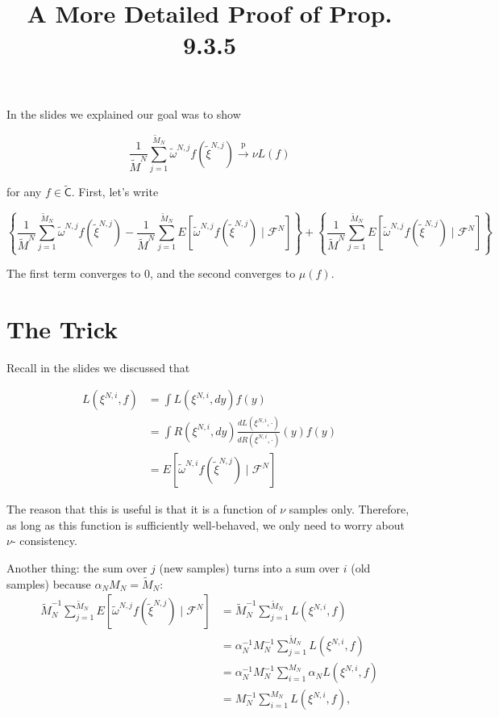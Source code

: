 \documentclass{article}
\title{A More Detailed Proof of Prop. 9.3.5}
\begin{document}
\maketitle

In the slides we explained our goal was to show 

$$
\frac{1}{\tilde{M}^N} \sum_{j=1}^{\tilde{M}_N} \tilde{\omega}^{N,j} f(\tilde{\xi}^{N,j})\overset{\text{p}}{\to} \nu L(f)
$$

for any $f \in \tilde{\mathsf{C}}$. First, let's write

$$  
\left\{
\frac{1}{\tilde{M}^N} \sum_{j=1}^{\tilde{M}_N} \tilde{\omega}^{N,j} f(\tilde{\xi}^{N,j}) 
- \frac{1}{\tilde{M}^N} \sum_{j=1}^{\tilde{M}_N} E\left[ \tilde{\omega}^{N,j} f(\tilde{\xi}^{N,j}) \mid \mathcal{F}^N \right]  \right\}
+ \left\{ \frac{1}{\tilde{M}^N} \sum_{j=1}^{\tilde{M}_N} E\left[ \tilde{\omega}^{N,j} f(\tilde{\xi}^{N,j}) \mid \mathcal{F}^N \right]  \right\}
$$

The first term converges to $0$, and the second converges to $\mu(f)$. 

\section{The Trick}

Recall in the slides we discussed that 

\begin{align*}
L(\xi^{N,i}, f) &= 
\int L(\xi^{N,i}, dy) f(y) \\
&= \int  R(\xi^{N,i},dy) \frac{d L(\xi^{N,i}, \cdot)}{ dR(\xi^{N,i}, \cdot) }(y) f(y) \\
&= E\left[ \tilde{\omega}^{N,i} f(\tilde{\xi}^{N,j}) \mid \mathcal{F}^N \right]
\end{align*}

The reason that this is useful is that it is a function of $\nu$ samples only. Therefore, as long as this function is sufficiently well-behaved, we only need to worry about $\nu$- consistency.

Another thing: the sum over $j$ (new samples) turns into a sum over $i$ (old samples) because $\alpha_N M_N = \tilde{M}_N$:
\begin{align*}
\tilde{M}_N^{-1} \sum_{j=1}^{\tilde{M}_N} E\left[ \tilde{\omega}^{N,j} f(\tilde{\xi}^{N,j})\mid \mathcal{F}^N\right] &= \tilde{M}_N^{-1} \sum_{j=1}^{\tilde{M}_N} L(\xi^{N,i},f) \\
&= \alpha_N^{-1} M_N^{-1} \sum_{j=1}^{\tilde{M}_N} L(\xi^{N,i},f) \\
&= \alpha_N^{-1} M_N^{-1} \sum_{i=1}^{M_N} \alpha_N L(\xi^{N,i},f) \\
&=  M_N^{-1} \sum_{i=1}^{M_N}  L(\xi^{N,i},f) ,
\end{align*}
\end{document}
